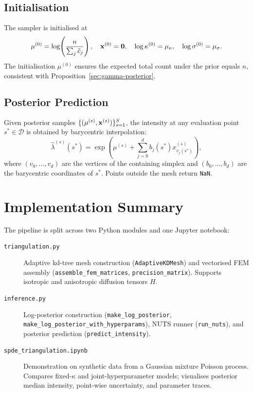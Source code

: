 \documentclass[11pt]{article}
\begin{document}
\subsection{Initialisation}

The sampler is initialised at
\begin{equation}
  \mu^{(0)} = \log\!\left(\frac{n}{\sum_j \tilde{c}_j}\right),
  \quad \mathbf{x}^{(0)} = \mathbf{0},
  \quad \log\kappa^{(0)} = \mu_\kappa,
  \quad \log\sigma^{(0)} = \mu_\sigma.
  \label{eq:init}
\end{equation}
The initialisation $\mu^{(0)}$ ensures the expected total count under the
prior equals $n$, consistent with Proposition~\ref{sec:gamma-posterior}.

\subsection{Posterior Prediction}

Given posterior samples $\{(\mu^{(s)}, \mathbf{x}^{(s)})\}_{s=1}^S$, the intensity
at any evaluation point $s^* \in \mathcal{D}$ is obtained by barycentric
interpolation:
\begin{equation}
  \hat\lambda^{(s)}(s^*) = \exp\!\left(\mu^{(s)} + \sum_{j=0}^d b_j(s^*) x^{(s)}_{v_j(s^*)}\right),
\end{equation}
where $(v_0, \ldots, v_d)$ are the vertices of the containing simplex and
$(b_0, \ldots, b_d)$ are the barycentric coordinates of $s^*$.
Points outside the mesh return \texttt{NaN}.
\section{Implementation Summary}

The pipeline is split across two Python modules and one Jupyter notebook:

\begin{description}
  \item[\texttt{triangulation.py}] Adaptive kd-tree mesh construction
    (\texttt{AdaptiveKDMesh}) and vectorised FEM assembly
    (\texttt{assemble\_fem\_matrices}, \texttt{precision\_matrix}).
    Supports isotropic and anisotropic diffusion tensors $H$.

  \item[\texttt{inference.py}] Log-posterior construction
    (\texttt{make\_log\_posterior}, \texttt{make\_log\_posterior\_with\_hyperparams}),
    NUTS runner (\texttt{run\_nuts}), and posterior prediction
    (\texttt{predict\_intensity}).

  \item[\texttt{spde\_triangulation.ipynb}] Demonstration on synthetic data from
    a Gaussian mixture Poisson process.  Compares fixed-$\kappa$ and
    joint-hyperparameter models; visualises posterior median intensity,
    point-wise uncertainty, and parameter traces.
\end{description}
\end{document}

